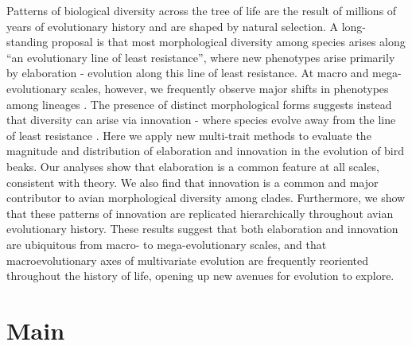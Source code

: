 \documentclass[12pt,letterpaper]{article}
\begin{document}
Patterns of biological diversity across the tree of life are the result of millions of years of evolutionary history and are shaped by natural selection.
A long-standing proposal is that most morphological diversity among species arises along ``an evolutionary line of least resistance'', where new phenotypes arise primarily by elaboration - evolution along this line of least resistance.
At macro and mega-evolutionary scales, however, we frequently observe major shifts in phenotypes among lineages \cite{venditti2011multiple, pagel2022general}.
The presence of distinct morphological forms suggests instead that diversity can arise via innovation - where species evolve away from the line of least resistance \cite{endler2005animal, renaud2006conserved}.
Here we apply new multi-trait methods to evaluate the magnitude and distribution of elaboration and innovation in the evolution of bird beaks.
Our analyses show that elaboration is a common feature at all scales, consistent with theory.
We also find that innovation is a common and major contributor to avian morphological diversity among clades.
Furthermore, we show that these patterns of innovation are replicated hierarchically throughout avian evolutionary history.
These results suggest that both elaboration and innovation are ubiquitous from macro- to mega-evolutionary scales, and that macroevolutionary axes of multivariate evolution are frequently reoriented throughout the history of life, opening up new avenues for evolution to explore.

\section{Main}
\end{document}
